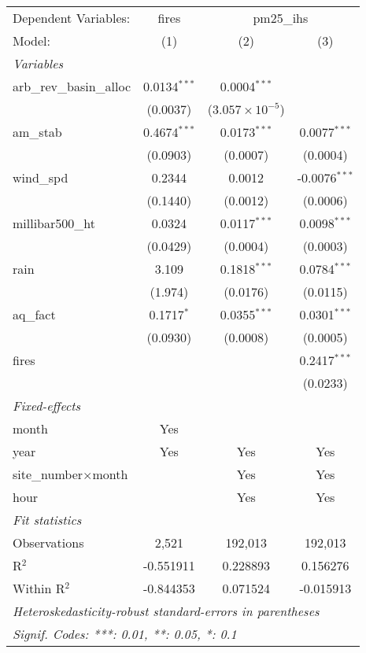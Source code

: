 \begin{tabular}{lccc}
\tabularnewline\midrule\midrule
Dependent Variables:&fires&\multicolumn{2}{c}{pm25\_ihs}\\
Model:&(1) & (2) & (3)\\
\midrule \emph{Variables}&   &   &  \\
arb\_rev\_basin\_alloc&0.0134$^{***}$ & 0.0004$^{***}$ &   \\
  &(0.0037) & ($3.057\times 10^{-5}$) &   \\
am\_stab&0.4674$^{***}$ & 0.0173$^{***}$ & 0.0077$^{***}$\\
  &(0.0903) & (0.0007) & (0.0004)\\
wind\_spd&0.2344 & 0.0012 & -0.0076$^{***}$\\
  &(0.1440) & (0.0012) & (0.0006)\\
millibar500\_ht&0.0324 & 0.0117$^{***}$ & 0.0098$^{***}$\\
  &(0.0429) & (0.0004) & (0.0003)\\
rain&3.109 & 0.1818$^{***}$ & 0.0784$^{***}$\\
  &(1.974) & (0.0176) & (0.0115)\\
aq\_fact&0.1717$^{*}$ & 0.0355$^{***}$ & 0.0301$^{***}$\\
  &(0.0930) & (0.0008) & (0.0005)\\
fires&   &    & 0.2417$^{***}$\\
  &   &    & (0.0233)\\
\midrule \emph{Fixed-effects}&   &   &  \\
month & Yes &  & \\
year & Yes & Yes & Yes\\
site\_number$\times$month &  & Yes & Yes\\
hour &  & Yes & Yes\\
\midrule \emph{Fit statistics}&  & & \\
Observations & 2,521&192,013&192,013\\
R$^2$ & -0.551911&0.228893&0.156276\\
Within R$^2$ & -0.844353&0.071524&-0.015913\\
\midrule\midrule\multicolumn{4}{l}{\emph{Heteroskedasticity-robust standard-errors in parentheses}}\\
\multicolumn{4}{l}{\emph{Signif. Codes: ***: 0.01, **: 0.05, *: 0.1}}\\
\end{tabular}


